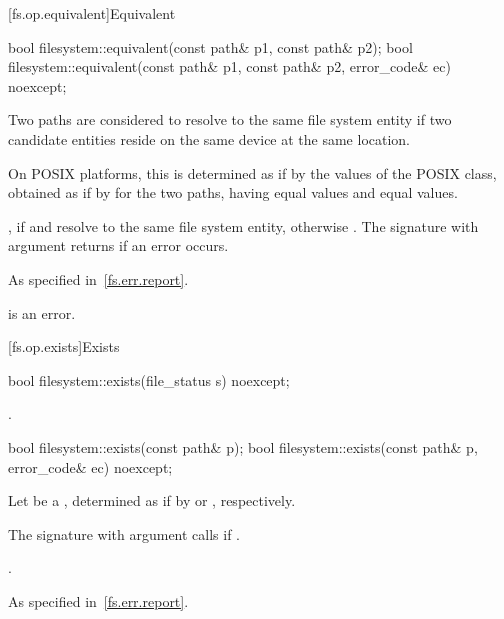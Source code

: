 [fs.op.equivalent]{Equivalent}

%
\begin{itemdecl}
bool filesystem::equivalent(const path& p1, const path& p2);
bool filesystem::equivalent(const path& p1, const path& p2, error_code& ec) noexcept;
\end{itemdecl}

\begin{itemdescr}
\pnum
Two paths are considered to resolve to the same file system entity if two
  candidate entities reside on the same device at the same location.
  \begin{note}
  On POSIX platforms, this is
  determined as if by the values of the POSIX  class,
  obtained as if by  for the two paths, having equal  values
  and equal  values.
  \end{note}

\pnum
\returns
{}, if  and  resolve to the same file
  system entity, otherwise . The signature with argument 
  returns  if an error occurs.

\pnum
\throws
As specified in~\ref{fs.err.report}.

\pnum
\remarks
{} is an error.
\end{itemdescr}


[fs.op.exists]{Exists}

%
\begin{itemdecl}
bool filesystem::exists(file_status s) noexcept;
\end{itemdecl}

\begin{itemdescr}
\pnum
\returns
{}.
\end{itemdescr}

%
\begin{itemdecl}
bool filesystem::exists(const path& p);
bool filesystem::exists(const path& p, error_code& ec) noexcept;
\end{itemdecl}

\begin{itemdescr}
\pnum
Let  be a ,
determined as if by  or , respectively.

\pnum
\effects
The signature with argument  calls 
if .

\pnum
\returns
{}.

\pnum
\throws
As specified in~\ref{fs.err.report}.
\end{itemdescr}


